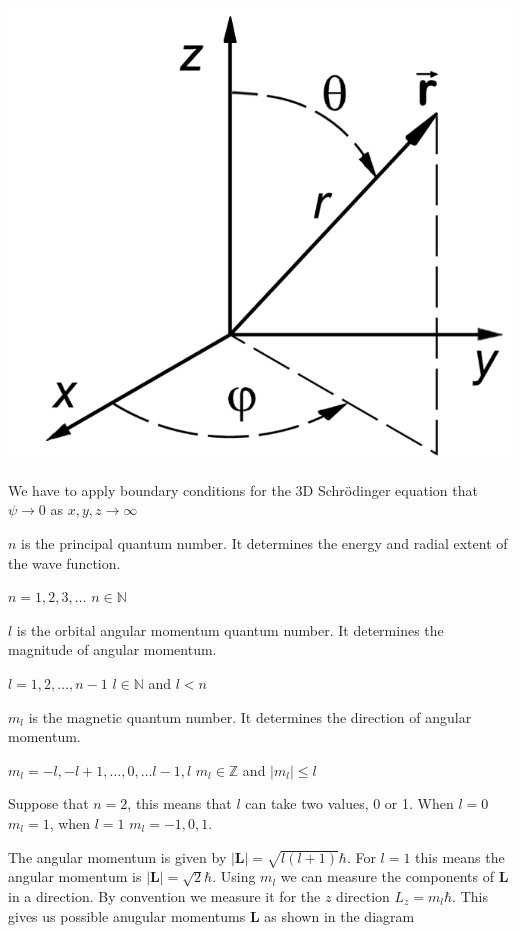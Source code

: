 \documentclass{article}
\renewcommand{\vec}[1]{\bm{#1}}
\newcommand{\vv}[1]{\vec{#1}}
\newcommand{\bb}[1]{\mathbb{#1}}
\newcommand{\hb}{\hbar}
\begin{document}
\section{}

\begin{center}
\includegraphics[scale = 0.2]{SphericalPolarCoordinates}
\end{center}


We have to apply boundary conditions for the 3D Schr\"odinger equation that \(\psi\to0\) as \(x,y,z\to\infty\)

\(n\) is the principal quantum number. It determines the energy and radial extent of the wave function.

\(n=1,2,3,\dots\) \(n\in\bb N\)

\(l\) is the orbital angular momentum quantum number. It determines the magnitude of angular momentum.

\(l=1,2,\dots,n-1\) \(l\in\bb N\) and \(l<n\)

\(m_l\) is the magnetic quantum number. It determines the direction of angular momentum.

\(m_l=-l,-l+1,\dots,0,\dots l-1,l\) \(m_l\in\bb Z\) and \(|m_l|\le l\)

Suppose that \(n=2\), this means that \(l\) can take two values, 0 or 1. When \(l=0\) \(m_l=1\), when \(l=1\) \(m_l=-1,0,1\).

The angular momentum is given by \(|\vv L|=\sqrt{l(l+1)}\hb\). For \(l=1\) this means the angular momentum is \(|\vv L|=\sqrt{2}\hb\). Using \(m_l\) we can measure the components of \(\vv L\) in a direction. By convention we measure it for the \(z\) direction \(L_z=m_l\hb\). This gives us possible anugular momentums \(\vv L\) as shown in the diagram
\end{document}
